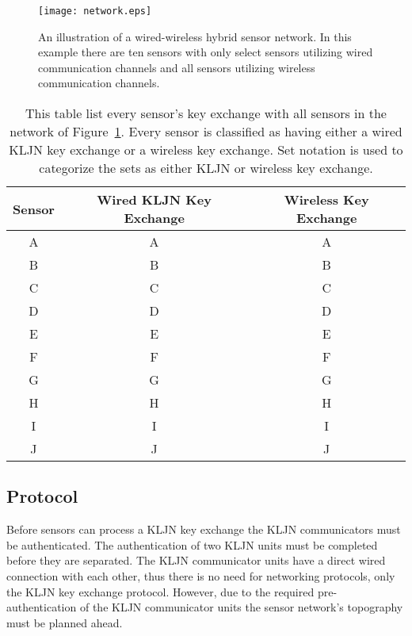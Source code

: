 \documentclass{ws-fnl2}
\begin{document}
\begin{figure}[ht]
    \label{fig:network}
\centering
\texttt{[image: network.eps]}
\vspace*{8pt}
\caption{An illustration of a wired-wireless hybrid sensor network. In this example there are ten sensors with only select sensors utilizing wired communication channels and all sensors utilizing wireless communication channels.}
\end{figure}


\begin{table}[ht]
\caption{This table list every sensor's key exchange with all sensors in the network of Figure~\ref{fig:network}. Every sensor is classified as having either a wired KLJN key exchange or a wireless key exchange. Set notation is used to categorize the sets as either KLJN or wireless key exchange. }
  \begin{center}
    \begin{tabular}{| c | c | c |}
    \hline
    Sensor & Wired KLJN Key Exchange & Wireless Key Exchange  \\
    \hline
     A & A & A \\
     \hline
     B & B & B \\
     \hline
     C & C  & C \\
     \hline
     D & D & D \\
     \hline
     E & E & E \\
     \hline
     F & F & F \\
     \hline
     G & G & G \\
     \hline
     H & H & H \\
     \hline
     I & I & I \\
     \hline
     J & J & J \\
    \hline
    \end{tabular}
  \end{center}
  \label{table:ke}
\end{table}


\subsection{Protocol}

Before sensors can process a KLJN key exchange the KLJN communicators must be authenticated. The authentication of two KLJN units must be completed before they are separated. The KLJN communicator units have a direct wired connection with each other, thus there is no need for networking protocols, only the KLJN key exchange protocol. However, due to the required pre-authentication of the KLJN communicator units the sensor network's topography must be planned ahead.
\end{document}
